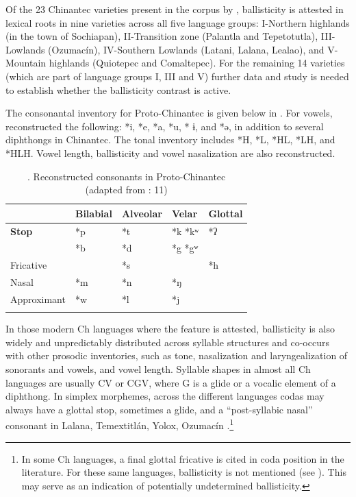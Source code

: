 \documentclass[output=paper]{langscibook}
\begin{document}
Of the 23 Chinantec varieties present in the corpus by \citet{Rensch1968}, ballisticity is attested in lexical roots in nine varieties across all five language groups: I-Northern highlands (in the town of Sochiapan), II-Transition zone (Palantla and Tepetotutla), III-Lowlands (Ozumacín), IV-Southern Lowlands (Latani, Lalana, Lealao), and V-Mountain highlands (Quiotepec and Comaltepec). For the remaining 14 varieties (which are part of language groups I, III and V) further data and study is needed to establish whether the ballisticity contrast is active. 

The consonantal inventory for Proto-Chinantec is given below in . For vowels, \citet[11]{Rensch1989} reconstructed the following: *i, *e, *a, *u, * ɨ, and *ə, in addition to several diphthongs in Chinantec. The tonal inventory includes *H, *L, *HL, *LH, and *HLH. Vowel length, ballisticity and vowel nasalization are also reconstructed. 

\begin{table}
\begin{tabularx}{\textwidth}{lXXXl}
\lsptoprule
  & Bilabial & Alveolar & Velar & Glottal\\
\midrule
{\bfseries Stop} & { *p}  & { *t} & { *k   *kʷ} & { *ʔ}\\
& { *b} & { *d} & { *g    *gʷ} & \\
\tablevspace
Fricative &  & { *s} &  & { *h}\\
\tablevspace
Nasal & { *m} & { *n} & { *ŋ} & \\
\tablevspace
Approximant & { *w} & { *l} & { *j} & \\
\lspbottomrule
\end{tabularx}
\caption{\label{tab:dobui:7}. Reconstructed consonants in Proto-Chinantec\\
(adapted from \citealt{Rensch1989}: 11)}
\end{table}

In those modern Ch languages where the feature is attested, ballisticity is also widely and unpredictably distributed across syllable structures and co-occurs with other prosodic inventories, such as tone, nasalization and laryngealization of sonorants and vowels, and vowel length. Syllable shapes in almost all Ch languages are usually CV or CGV, where G is a glide or a vocalic element of a diphthong. In simplex morphemes, across the different languages codas may always have a glottal stop, sometimes a glide, and a “post-syllabic nasal” consonant in Lalana, Temextitlán, Yolox, Ozumacín \citep{Rensch1968}.\footnote{In some Ch languages, a final glottal fricative is cited in coda position in the literature. For these same languages, ballisticity is not mentioned (see \citealt{Rensch1968}). This may serve as an indication of potentially undetermined ballisticity.} 
\end{document}
